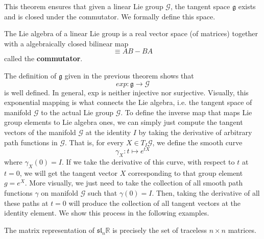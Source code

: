 \documentclass{article}
\begin{document}
    This theorem ensures that given a linear Lie group $\mathcal{G}$, the tangent space $\mathfrak{g}$ exists and is closed under the commutator. We formally define this space. 

    \begin{definition}
      The Lie algebra of a linear Lie group is a real vector space (of matrices) together with a algebraically closed bilinear map 
      \begin{equation}
        [A,B] \equiv A B - B A
      \end{equation}
      called the \textbf{commutator}. 
    \end{definition} 

    The definition of $\mathfrak{g}$ given in the previous theorem shows that 
    \begin{equation}
      exp: \mathfrak{g} \longrightarrow \mathcal{G}
    \end{equation}
    is well defined. In general, exp is neither injective nor surjective. Visually, this exponential mapping is what connects the Lie algebra, i.e. the tangent space of manifold $\mathcal{G}$ to the actual Lie group $\mathcal{G}$. To define the inverse map that maps Lie group elements to Lie algebra ones, we can simply just compute the tangent vectors of the manifold $\mathcal{G}$ at the identity $I$ by taking the derivative of arbitrary path functions in $\mathcal{G}$. That is, for every $X \in T_I \mathcal{G}$, we define the smooth curve 
    \begin{equation}
      \gamma_X: t \mapsto e^{tX}
    \end{equation}
    where $\gamma_X(0) = I$. If we take the derivative of this curve, with respect to $t$ at $t = 0$, we will get the tangent vector $X$ corresponding to that group element $g = e^{X}$. More visually, we just need to take the collection of all smooth path functions $\gamma$ on manifold $\mathcal{G}$ such that $\gamma(0) = I$. Then, taking the derivative of all these paths at $t = 0$ will produce the collection of all tangent vectors at the identity element. We show this process in the following examples. 

    \begin{theorem}
      The matrix representation of $\mathfrak{sl}_n \mathbb{R}$ is precisely the set of traceless $n \times n$ matrices. 
    \end{theorem}
\end{document}
